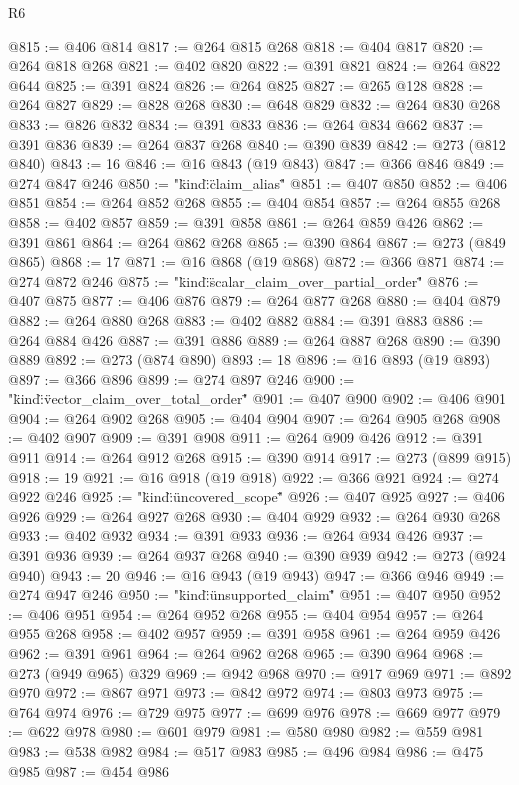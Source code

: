 \begin{lexlean}{R6}
\begin{coremodule}
{{{{{{{{{{{{{{@815 := @406 @814
@817 := @264 @815 @268
@818 := @404 @817
@820 := @264 @818 @268
@821 := @402 @820
@822 := @391 @821
@824 := @264 @822 @644
@825 := @391 @824
@826 := @264 @825
@827 := @265 @128
@828 := @264 @827
@829 := @828 @268
@830 := @648 @829
@832 := @264 @830 @268
@833 := @826 @832
@834 := @391 @833
@836 := @264 @834 @662
@837 := @391 @836
@839 := @264 @837 @268
@840 := @390 @839
@842 := @273 (@812 @840)
@843 := 16
@846 := @16 @843 (@19 @843)
@847 := @366 @846
@849 := @274 @847 @246
@850 := "{\"kind\":\"claim_alias\""
@851 := @407 @850
@852 := @406 @851
@854 := @264 @852 @268
@855 := @404 @854
@857 := @264 @855 @268
@858 := @402 @857
@859 := @391 @858
@861 := @264 @859 @426
@862 := @391 @861
@864 := @264 @862 @268
@865 := @390 @864
@867 := @273 (@849 @865)
@868 := 17
@871 := @16 @868 (@19 @868)
@872 := @366 @871
@874 := @274 @872 @246
@875 := "{\"kind\":\"scalar_claim_over_partial_order\""
@876 := @407 @875
@877 := @406 @876
@879 := @264 @877 @268
@880 := @404 @879
@882 := @264 @880 @268
@883 := @402 @882
@884 := @391 @883
@886 := @264 @884 @426
@887 := @391 @886
@889 := @264 @887 @268
@890 := @390 @889
@892 := @273 (@874 @890)
@893 := 18
@896 := @16 @893 (@19 @893)
@897 := @366 @896
@899 := @274 @897 @246
@900 := "{\"kind\":\"vector_claim_over_total_order\""
@901 := @407 @900
@902 := @406 @901
@904 := @264 @902 @268
@905 := @404 @904
@907 := @264 @905 @268
@908 := @402 @907
@909 := @391 @908
@911 := @264 @909 @426
@912 := @391 @911
@914 := @264 @912 @268
@915 := @390 @914
@917 := @273 (@899 @915)
@918 := 19
@921 := @16 @918 (@19 @918)
@922 := @366 @921
@924 := @274 @922 @246
@925 := "{\"kind\":\"uncovered_scope\""
@926 := @407 @925
@927 := @406 @926
@929 := @264 @927 @268
@930 := @404 @929
@932 := @264 @930 @268
@933 := @402 @932
@934 := @391 @933
@936 := @264 @934 @426
@937 := @391 @936
@939 := @264 @937 @268
@940 := @390 @939
@942 := @273 (@924 @940)
@943 := 20
@946 := @16 @943 (@19 @943)
@947 := @366 @946
@949 := @274 @947 @246
@950 := "{\"kind\":\"unsupported_claim\""
@951 := @407 @950
@952 := @406 @951
@954 := @264 @952 @268
@955 := @404 @954
@957 := @264 @955 @268
@958 := @402 @957
@959 := @391 @958
@961 := @264 @959 @426
@962 := @391 @961
@964 := @264 @962 @268
@965 := @390 @964
@968 := @273 (@949 @965) @329
@969 := @942 @968
@970 := @917 @969
@971 := @892 @970
@972 := @867 @971
@973 := @842 @972
@974 := @803 @973
@975 := @764 @974
@976 := @729 @975
@977 := @699 @976
@978 := @669 @977
@979 := @622 @978
@980 := @601 @979
@981 := @580 @980
@982 := @559 @981
@983 := @538 @982
@984 := @517 @983
@985 := @496 @984
@986 := @475 @985
@987 := @454 @986
}}}}}}}}}}}}}}}}}}}
\end{coremodule}
\end{lexlean}
